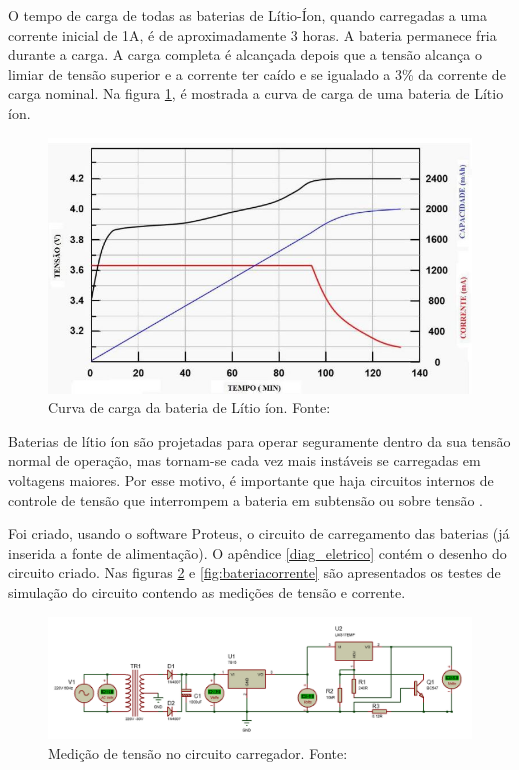 \par O tempo de carga de todas as baterias de Lítio-Íon, quando carregadas a uma corrente inicial de 1A, é de aproximadamente 3 horas. A bateria permanece fria durante a carga. A carga completa é alcançada depois que a tensão alcança o limiar de tensão superior e a corrente ter caído e se igualado a 3\% da corrente de carga nominal. Na figura \ref{fig:curvacarga}, é mostrada a curva de carga de uma bateria de Lítio íon.

\begin{figure}[!h]
	\centering
		\includegraphics[keepaspectratio=true,scale=0.5]{figuras/Curva_carga.JPG}
	\caption{Curva de carga da bateria de Lítio íon. Fonte: \cite{bateria_litio}}
	\label{fig:curvacarga}
\end{figure}

\par Baterias de lítio íon são projetadas para operar seguramente dentro da sua tensão normal de operação, mas tornam-se cada vez mais instáveis se carregadas em voltagens maiores. Por esse motivo, é importante que haja circuitos internos de controle de tensão que interrompem a bateria em subtensão ou sobre tensão \cite{bateria_litio}.

\par Foi criado, usando o software Proteus, o circuito de carregamento das baterias (já inserida a fonte de alimentação). O apêndice \ref{diag_eletrico} contém o desenho do circuito criado. Nas figuras \ref{fig:bateriatensao} e \ref{fig:bateriacorrente} são apresentados os testes de simulação do circuito contendo as medições de tensão e corrente.

\begin{figure}[!h]
	\centering
		\includegraphics[keepaspectratio=true,scale=0.5]{figuras/Medição - Tensão.PNG}
	\caption{Medição de tensão no circuito carregador. Fonte: \cite{retificador}}
	\label{fig:bateriatensao}
\end{figure}

